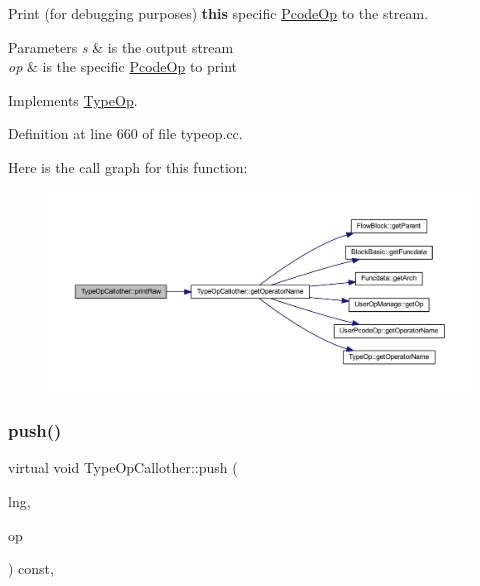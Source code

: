 Print (for debugging purposes) {\bfseries{this}} specific \mbox{\hyperlink{class_pcode_op}{Pcode\+Op}} to the stream. 


\begin{DoxyParams}{Parameters}
{\em s} & is the output stream \\
\hline
{\em op} & is the specific \mbox{\hyperlink{class_pcode_op}{Pcode\+Op}} to print \\
\hline
\end{DoxyParams}


Implements \mbox{\hyperlink{class_type_op_a60717e486917a30cc7cb6e3ce02585e1}{Type\+Op}}.



Definition at line 660 of file typeop.\+cc.

Here is the call graph for this function\+:
\nopagebreak
\begin{figure}[H]
\begin{center}
\leavevmode
\includegraphics[width=350pt]{class_type_op_callother_ad663593c2bd0654a4ce68d8aa8a3b179_cgraph}
\end{center}
\end{figure}
\mbox{\label{class_type_op_callother_ae5f1ef0859a04beb3efebf3a2216347b}} 
\subsubsection{\texorpdfstring{push()}{push()}}
{\footnotesize\ttfamily virtual void Type\+Op\+Callother\+::push (\begin{DoxyParamCaption}\item[{\mbox{\hyperlink{class_print_language}{Print\+Language}} $\ast$}]{lng,  }\item[{const \mbox{\hyperlink{class_pcode_op}{Pcode\+Op}} $\ast$}]{op }\end{DoxyParamCaption}) const\hspace{0.3cm}{\ttfamily [inline]}, {\ttfamily [virtual]}}



